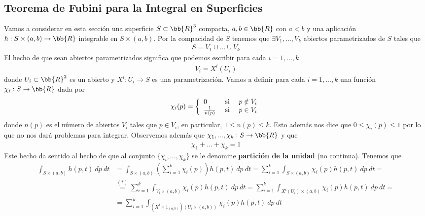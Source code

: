 \subsection{Teorema de Fubini para la Integral en Superficies}
Vamos a considerar en esta sección una superficie $S\subset \bb{R}^3$ compacta, $a,b\in \bb{R}$ con $a<b$ y una aplicación $h:S\times(a,b)\to \bb{R}$ integrable en $S\times(a,b)$. Por la compacidad de $S$ tenemos que $\exists V_1,...,V_k$ abiertos parametrizados de $S$ tales que
\begin{gather*}
    S = V_1\cup ... \cup V_k
\end{gather*}
El hecho de que sean abiertos parametrizados significa que podemos escribir para cada $i=1,...,k$
\begin{gather*}
    V_i = X^i(U_i)
\end{gather*}
donde $U_i\subset \bb{R}^2$ es un abierto y $X^i:U_i \to S$ es una parametrización. Vamos a definir para cada $i=1,...,k$ una función $\chi_i: S \to \bb{R}$ dada por
\begin{gather*}
    \chi_i(p) = \left\{
        \begin{array}{l c c}
            0 & \text{ si } & p\notin V_i\\
            \frac{1}{n(p)} & \text{ si } & p\in V_i
        \end{array}
    \right.
\end{gather*}
donde $n(p)$ es el número de abiertos $V_i$ tales que $p\in V_i$, en particular, $1 \leq n(p) \leq k$. Esto además nos dice que $0\leq \chi_i(p)\leq 1$ por lo que no nos dará problemas para integrar. Observemos además que $\chi_1, ..., \chi_k:S\to \bb{R}$ y que
\begin{gather*}
    \chi_1 + ... + \chi_k=1
\end{gather*}
Este hecho da sentido al hecho de que al conjunto $\{\chi_i, ..., \chi_k\}$ se le denomine \textbf{partición de la unidad} (no continua). Tenemos que
\begin{align*}
    \int_{S\times(a,b)} h(p,t)\ dp\ dt &= 
    \int_{S\times(a,b)} \left(\sum_{i=1}^k \chi_i(p)\right) h(p,t)\ dp\ dt =
    \sum_{i=1}^k \int_{S\times(a,b)} \chi_i(p)h(p,t)\ dp\ dt =\\
    &\overset{(\ast)}{=}
    \sum_{i=1}^k \int_{V_i\times(a,b)} \chi_i(p)h(p,t)\ dp\ dt =
    \sum_{i=1}^k \int_{X^i(U_i)\times(a,b)} \chi_i(p)h(p,t)\ dp\ dt = \\
    &=
    \sum_{i=1}^k \int_{(X^i\times 1_{(a,b)})(U_i\times(a,b))} \chi_i(p)h(p,t)\ dp\ dt
\end{align*}
